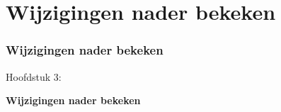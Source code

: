 %

\section{Wijzigingen nader bekeken}
\begin{frame}[fragile]
	\frametitle{Wijzigingen nader bekeken}

	\begin{center}\huge{Hoofdstuk 3:}\end{center}
	\begin{center}\huge{\color{typo3darkgrey}\textbf{Wijzigingen nader bekeken}}\end{center}

\end{frame}


